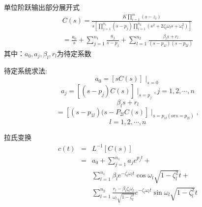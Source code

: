 \begin{frame}
\begin{block}{单位阶跃输出部分展开式}
\begin{eqnarray*}
C(s)=\frac{K\prod_{i=1}^m(s-z_i)}{s[\prod_{j=1}^{n_1}(s-p_j)\prod_{i=1}^{n_2}(s^2+2\zeta_l\omega_ls+\omega_l^2)]}\\
=\frac{a_0}{s}+\sum_{j=1}^{n_1}\frac{a_j}{s-p_j}+\sum_{l=1}^{n_2}\frac{\beta_ls+r_l}{(s-p_{1l})(s-p_{2l})}
\end{eqnarray*}
其中：$a_0,a_j,\beta_l,r_l$为待定系数
\end{block}
\end{frame}
\begin{frame}
待定系统求法:
\[a_0=[sC(s)]\mid_{s=0}\]
\[a_j=[(s-p_j)C(s)]\mid_{s=p_j},j=1,2,\cdots ,n\]
\[\beta_ls+r_l \]
\[=[(s-p_{1l})(s-P_{2l}C(s)]\mid_{s=p_{1l}(or s=p_{2l})},\]
\[l=1,2,\cdots ,n\]
\end{frame}
\begin{frame}
\begin{block}{拉氏变换}
\begin{eqnarray*}
c(t)&=&L^{-1}[C(s)]\\
&=&a_0+\sum_{j=1}^{n_1}a_je^{p_jt}+\\
&&\sum_{l=1}^{n_1}\beta_le^{-\zeta_l\omega_lt}\cos\omega_l\sqrt{1-\zeta^2_l}t+\\
&&\sum_{l=1}^{n_2}\frac{r_l-\beta_l\zeta_l\omega_l}{\omega_l\sqrt{1-\zeta_l^2}}e^{-\zeta_l\omega_lt}\sin\omega_l\sqrt{1-\zeta_l^2}t
\end{eqnarray*}
\end{block}
\end{frame}

